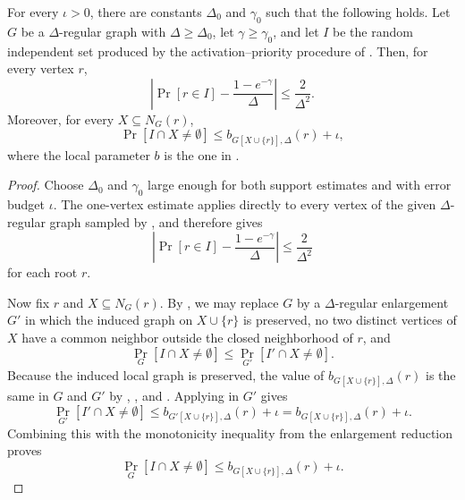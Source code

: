 \begin{theorem}
For every $\iota>0$, there are constants $\Delta_0$ and $\gamma_0$ such that
the following holds.  Let $G$ be a $\Delta$-regular graph with
$\Delta\ge\Delta_0$, let $\gamma\ge\gamma_0$, and let $I$ be the random
independent set produced by the activation--priority procedure of
.  Then, for every vertex $r$,
\[
\left|\Pr[r\in I]-\frac{1-e^{-\gamma}}{\Delta}\right|\le \frac{2}{\Delta^2}.
\]
Moreover, for every $X\subseteq N_G(r)$,
\[
\Pr[I\cap X\ne\emptyset]\le b_{G[X\cup\{r\}],\Delta}(r)+\iota,
\]
where the local parameter $b$ is the one in .
\end{theorem}
\begin{proof}
Choose $\Delta_0$ and $\gamma_0$ large enough for both support estimates
 and
 with error budget $\iota$.  The
one-vertex estimate applies directly to every vertex of the given
$\Delta$-regular graph sampled by , and
therefore gives
\[
\left|\Pr[r\in I]-\frac{1-e^{-\gamma}}{\Delta}\right|\le \frac{2}{\Delta^2}
\]
for each root $r$.

Now fix $r$ and $X\subseteq N_G(r)$.  By
, we may replace $G$ by a
$\Delta$-regular enlargement $G'$ in which the induced graph on
$X\cup\{r\}$ is preserved, no two distinct vertices of $X$ have a common
neighbor outside the closed neighborhood of $r$, and
\[
\Pr_G[I\cap X\ne\emptyset]\le \Pr_{G'}[I'\cap X\ne\emptyset].
\]
Because the induced local graph is preserved, the value of
$b_{G[X\cup\{r\}],\Delta}(r)$ is the same in $G$ and $G'$ by
, , and
.  Applying
 in $G'$ gives
\[
\Pr_{G'}[I'\cap X\ne\emptyset]\le
b_{G'[X\cup\{r\}],\Delta}(r)+\iota
=b_{G[X\cup\{r\}],\Delta}(r)+\iota .
\]
Combining this with the monotonicity inequality from the enlargement
reduction proves
\[
\Pr_G[I\cap X\ne\emptyset]\le
b_{G[X\cup\{r\}],\Delta}(r)+\iota .
\]
\end{proof}
